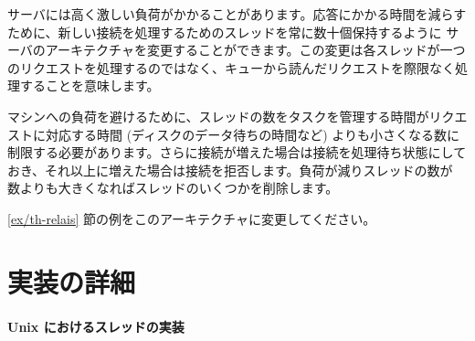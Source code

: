 \begin{exercise}[noanswer]
\http サーバには高く激しい負荷がかかることがあります。応答にかかる時間を減らすために、新しい接続を処理するためのスレッドを常に数十個保持するように \http サーバのアーキテクチャを変更することができます。この変更は各スレッドが一つのリクエストを処理するのではなく、キューから読んだリクエストを際限なく処理することを意味します。


マシンへの負荷を避けるために、スレッドの数をタスクを管理する時間がリクエストに対応する時間 (ディスクのデータ待ちの時間など) よりも小さくなる数に制限する必要があります。さらに接続が増えた場合は接続を処理待ち状態にしておき、それ以上に増えた場合は接続を拒否します。負荷が減りスレッドの数が  数よりも大きくなればスレッドのいくつかを削除します。

\ref{ex/th-relais} 節の例をこのアーキテクチャに変更してください。
\end{exercise}


\section{実装の詳細}

\paragraph {Unix におけるスレッドの実装}

